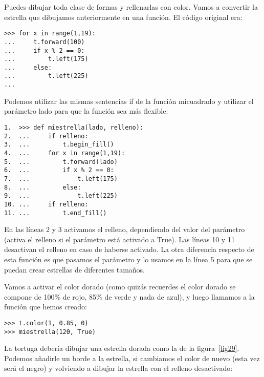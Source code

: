 Puedes dibujar toda clase de formas y rellenarlas con color. Vamos a convertir la estrella que dibujamos anteriormente en una función.  El código original era:

\begin{listing}
\begin{verbatim}
>>> for x in range(1,19):
...     t.forward(100)
...     if x % 2 == 0:
...         t.left(175)
...     else:
...         t.left(225)
...
\end{verbatim}
\end{listing}

Podemos utilizar las mismas sentencias if de la función micuadrado y utilizar el parámetro lado para que la función sea más flexible: 

\begin{listing}
\begin{verbatim}
1.  >>> def miestrella(lado, relleno):
2.  ...     if relleno:
3.  ...         t.begin_fill()
4.  ...     for x in range(1,19):
5.  ...         t.forward(lado)
6.  ...         if x % 2 == 0:
7.  ...             t.left(175)
8.  ...         else:
9.  ...             t.left(225)
10. ...     if relleno:
11. ...         t.end_fill()
\end{verbatim}
\end{listing}

En las líneas 2 y 3 activamos el relleno, dependiendo del valor del parámetro  (activa el relleno si el parámetro está activado a True). Las líneas 10 y 11 desactivan el relleno en caso de haberse activado.  La otra diferencia respecto de esta función es que pasamos el parámetro  y lo usamos en la línea 5 para que se puedan crear estrellas de diferentes tamaños.
\par
Vamos a activar el color dorado (como quizás recuerdes el color dorado se compone de 100\% de rojo, 85\% de verde y nada de azul), y luego llamamos a la función que hemos creado:

\begin{listing}
\begin{verbatim}
>>> t.color(1, 0.85, 0)
>>> miestrella(120, True)
\end{verbatim}
\end{listing}

\noindent
La tortuga debería dibujar una estrella dorada como la de la figura~\ref{fig29}. 
Podemos añadirle un borde a la estrella, si cambiamos el color de nuevo (esta vez será el negro) y volviendo a dibujar la estrella con el relleno desactivado:

